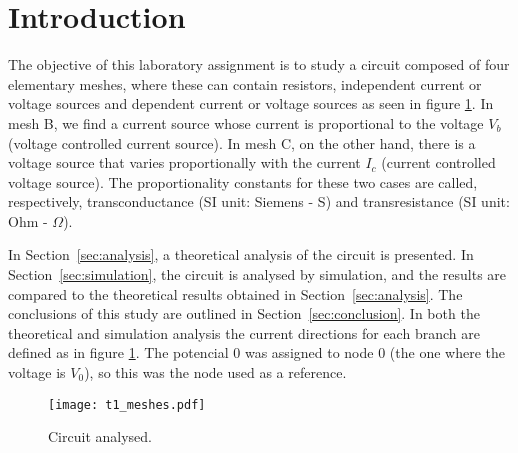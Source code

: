 \section{Introduction}
\label{sec:introduction}

The objective of this laboratory assignment is to study a circuit composed of
four elementary meshes, where these can contain resistors, independent current or voltage sources
and dependent current or voltage sources as seen in figure
\ref{fig:rc}.
In mesh B, we find a current source whose current is proportional to the voltage $V_{b}$
(voltage controlled current source).
In mesh C, on the other hand, there is a voltage source that varies proportionally
with the current $I_c$ (current controlled voltage source).
The proportionality constants for these two cases are called, respectively,
transconductance (SI unit: Siemens - S) and transresistance (SI unit: Ohm - $\Omega$).

In Section~\ref{sec:analysis}, a theoretical analysis of the circuit is
presented. In Section~\ref{sec:simulation}, the circuit is analysed by
simulation, and the results are compared to the theoretical results obtained in
Section~\ref{sec:analysis}. The conclusions of this study are outlined in
Section~\ref{sec:conclusion}. In both the theoretical and simulation analysis the current directions for each branch are defined as in figure \ref{fig:rc}. The potencial $0$ was assigned to node $0$ (the one where the voltage is $V_{0}$), so this was the node used as a reference.

\begin{figure}[h] \centering
    \texttt{[image: t1\_meshes.pdf]}
    \caption{Circuit analysed.}
    \label{fig:rc}
\end{figure}

